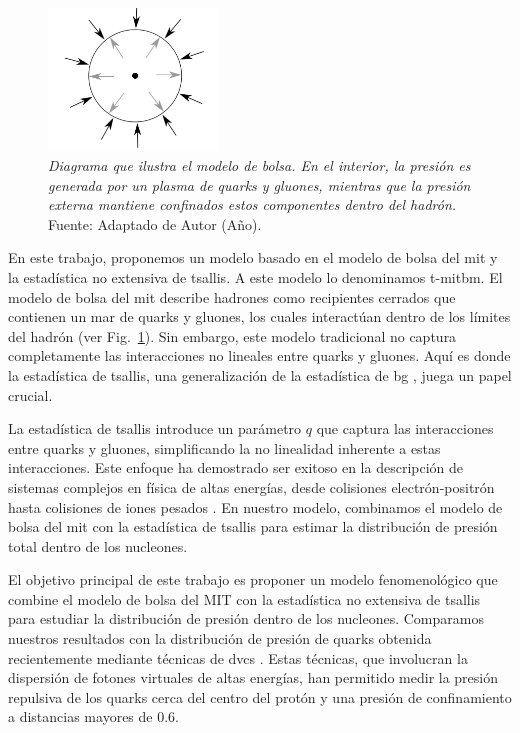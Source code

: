 \begin{figure}
    \centering
    \includegraphics[width=0.4\textwidth]{./Images/Bag model.png}
    \caption[Diagrama de bolsa]{\emph{Diagrama que ilustra el modelo de bolsa. En el interior, la presión es generada por un plasma de quarks y gluones, mientras que la presión externa mantiene confinados estos componentes dentro del hadrón.} Fuente: Adaptado de Autor (Año).}
    \label{fig:Bolsa }
\end{figure}

En este trabajo, proponemos un modelo basado en el modelo de bolsa del \gls{mit} \cite{Chodos_1974,Chodos1974a} y la estadística no extensiva de \Gls{tsallis}. A este modelo lo denominamos \gls{t-mitbm}. El modelo de bolsa del \gls{mit} describe hadrones como recipientes cerrados que contienen un mar de quarks y gluones, los cuales interactúan dentro de los límites del hadrón (ver Fig.~\ref{fig:Bolsa }). Sin embargo, este modelo tradicional no captura completamente las interacciones no lineales entre quarks y gluones. Aquí es donde la estadística de \Gls{tsallis}, una generalización de la estadística de \gls{bg} \cite{Tsallis1988,Beck_2003,Tsallis2009,Tsallis_2014,Tsallis_2009}, juega un papel crucial.

La estadística de \Gls{tsallis} introduce un parámetro $q$ que captura las interacciones entre quarks y gluones, simplificando la no linealidad inherente a estas interacciones. Este enfoque ha demostrado ser exitoso en la descripción de sistemas complejos en física de altas energías, desde colisiones electrón-positrón \cite{Bediaga_2000,Collaboration1984} hasta colisiones de iones pesados \cite{Saraswat_2018,Saraswat_2017}. En nuestro modelo, combinamos el modelo de bolsa del \gls{mit} con la estadística de \Gls{tsallis} para estimar la distribución de presión total dentro de los nucleones.

El objetivo principal de este trabajo es proponer un modelo fenomenológico que combine el modelo de bolsa del MIT con la estadística no extensiva de \Gls{tsallis} para estudiar la distribución de presión dentro de los nucleones. Comparamos nuestros resultados con la distribución de presión de quarks obtenida recientemente mediante técnicas de \gls{dvcs} \cite{Burkert_2018}. Estas técnicas, que involucran la dispersión de fotones virtuales de altas energías, han permitido medir la presión repulsiva de los quarks cerca del centro del protón y una presión de confinamiento a distancias mayores de $0.6$.

